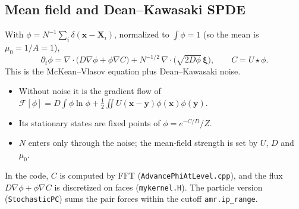 \documentclass[11pt]{article}
\newcommand{\code}[1]{\texttt{#1}}
\begin{document}
\subsection{Mean field and Dean--Kawasaki SPDE}
With $\phi = N^{-1}\sum_i\delta(\mathbf{x}-\mathbf{X}_i)$, normalized to
$\int\phi=1$ (so the mean is $\mu_0 = 1/A = 1$),
\begin{equation}
  \partial_t\phi = \nabla\cdot\bigl(D\nabla\phi + \phi\nabla C\bigr)
     + N^{-1/2}\,\nabla\cdot\bigl(\sqrt{2D\phi}\,\boldsymbol{\xi}\bigr),
  \qquad C = U\star\phi .
\end{equation}
This is the McKean--Vlasov equation plus Dean--Kawasaki noise.
\begin{itemize}
  \item Without noise it is the gradient flow of
        $\mathcal F[\phi] = D\!\int\!\phi\ln\phi
        + \tfrac12\!\iint U(\mathbf{x}-\mathbf{y})\phi(\mathbf{x})\phi(\mathbf{y})$.
  \item Its stationary states are fixed points of $\phi = e^{-C/D}/Z$.
  \item $N$ enters only through the noise; the mean-field strength is set by
        $U$, $D$ and $\mu_0$.
\end{itemize}
In the code, $C$ is computed by FFT (\code{AdvancePhiAtLevel.cpp}), and the
flux $D\nabla\phi+\phi\nabla C$ is discretized on faces (\code{mykernel.H}).
The particle version (\code{StochasticPC}) sums the pair forces within the
cutoff \code{amr.ip\_range}.
\end{document}
